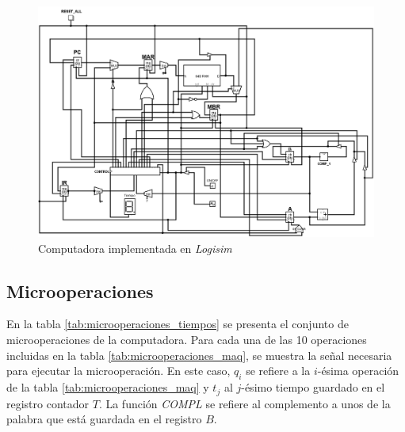 \documentclass{article}
\begin{document}
\begin{figure}[ht]
    \centering
    \includegraphics[width=\textwidth]{img/main.png}
    \caption{Computadora implementada en \textit{Logisim}}
    \label{fig:main_logisim}
\end{figure}




\subsection{Microoperaciones}

En la tabla \ref{tab:microoperaciones_tiempos} se presenta el conjunto de microoperaciones de la computadora. Para cada una de las 10 operaciones incluidas en la tabla \ref{tab:microoperaciones_maq}, se muestra la señal necesaria para ejecutar la microoperación. En este caso, $q_i$ se refiere a la $i$-ésima operación de la tabla \ref{tab:microoperaciones_maq} y $t_j$ al $j$-ésimo tiempo guardado en el registro contador $T$. La función \textit{COMPL} se refiere al complemento a unos de la palabra que está guardada en el registro $B$.
\end{document}
